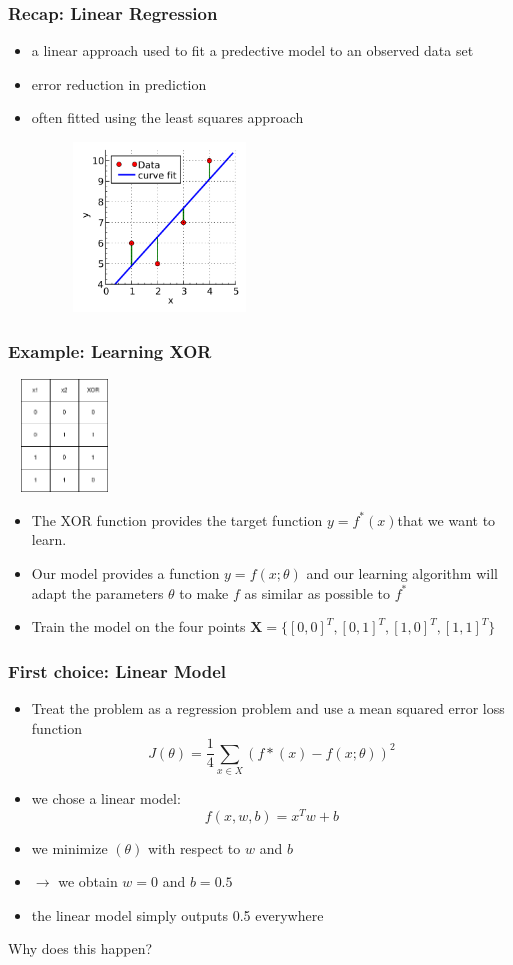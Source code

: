 \documentclass{beamer}
\begin{document}
\begin{frame}
	\frametitle{Recap: Linear Regression}
	\begin{itemize}
		\item a linear approach used to fit a predective model to an observed data set
		\item error reduction in prediction
			\pause
		\item often fitted using the least squares approach
	\end{itemize}
	\center 
	\includegraphics[width= 80mm, height= 45mm]{linear_least_squares.png}
\end{frame}
\begin{frame}
	\frametitle{Example: Learning XOR}
	\center
	\includegraphics[width= 30mm , height = 30mm]{xor_tabel.png}
	\begin{itemize}
		\item The XOR function provides the target function $y = f^{\ast}(x)$that we want to learn.
			\pause
		\item Our model provides a function $y = f(x ; \theta)$ and
our learning algorithm will adapt the parameters $\theta $ to make
			$f$ as similar as possible to $f^{\ast}$
\pause
\item Train the model on the four points $\mathbf{X}= \{ [0,0]^T , [0,1]^T , [1,0]^T, [1,1]^T  \}$	
	\end{itemize}
\end{frame}
\begin{frame}
	\frametitle{First choice: Linear Model}
	\begin{itemize}
\item Treat the problem as a regression problem and use a mean squared error loss function $$ J(\theta) = \frac{1}{4} \sum_{x \in X}{(f\ast(x) - f(x; \theta))^2}$$
	\pause
		\item we chose a linear model: $$ f(x, w, b) = x^Tw + b$$
		\pause
		\item we minimize $(\theta)$ with respect to $w$ and $b$
		\item $\rightarrow$ we obtain $w = 0$ and $b= 0.5$ 
		\item the linear model simply outputs 0.5 everywhere
	\end{itemize}
	\pause
	\center 
	Why does this happen?	
\end{frame}
\end{document}
